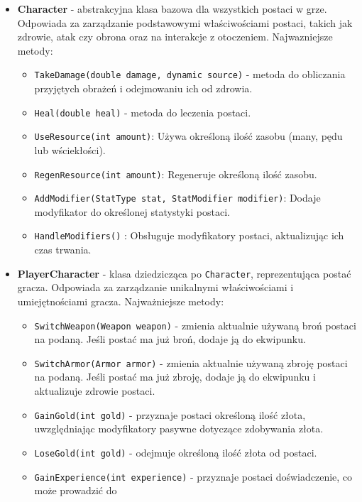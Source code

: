 \begin{itemize}
    \item \textbf{Character} - abstrakcyjna klasa bazowa dla wszystkich postaci w grze. 
    Odpowiada za zarządzanie podstawowymi właściwościami postaci, takich jak zdrowie, 
    atak czy obrona oraz na interakcje z otoczeniem. Najwazniejsze metody:
        \begin{itemize}
            \item \texttt{TakeDamage(double damage, dynamic source)} - metoda do obliczania przyjętych obrażeń 
            i odejmowaniu ich od zdrowia.
            \item \texttt{Heal(double heal)} - metoda do leczenia postaci.
            \item \texttt{UseResource(int amount)}: Używa określoną ilość zasobu (many, pędu lub wściekłości).
            \item \texttt{RegenResource(int amount)}: Regeneruje określoną ilość zasobu.
            \item \texttt{AddModifier(StatType stat, StatModifier modifier)}: Dodaje modyfikator do określonej statystyki postaci.
            \item \texttt{HandleModifiers()} : Obsługuje modyfikatory postaci, aktualizując ich czas trwania.
        \end{itemize}
        \item \textbf{PlayerCharacter} - klasa dziedzicząca po \texttt{Character}, reprezentująca postać gracza. 
        Odpowiada za zarządzanie unikalnymi właściwościami i umiejętnościami gracza. Najważniejsze metody:
            \begin{itemize}
                \item \texttt{SwitchWeapon(Weapon weapon)} - zmienia aktualnie używaną broń postaci na podaną. 
                Jeśli postać ma już broń, dodaje ją do ekwipunku.
                \item \texttt{SwitchArmor(Armor armor)} - zmienia aktualnie używaną zbroję postaci na podaną. 
                Jeśli postać ma już zbroję, dodaje ją do ekwipunku i aktualizuje zdrowie postaci.
                \item \texttt{GainGold(int gold)} - przyznaje postaci określoną ilość złota, uwzględniając modyfikatory 
                pasywne dotyczące zdobywania złota.
                \item \texttt{LoseGold(int gold)} - odejmuje określoną ilość złota od postaci.
                \item \texttt{GainExperience(int experience)} - przyznaje postaci doświadczenie, co może prowadzić do 

\end{itemize}
\end{itemize}
